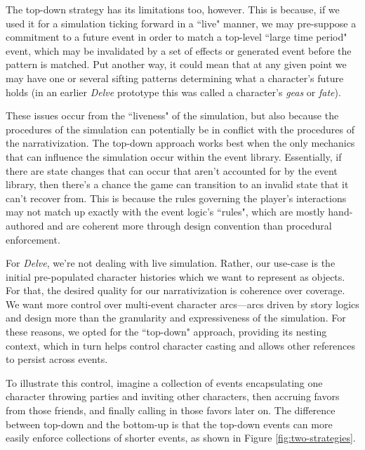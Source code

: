 
The top-down strategy has its limitations too, however. This is because, if we used it for a simulation ticking forward in a ``live" manner, we may pre-suppose a commitment to a future event in order to match a top-level ``large time period" event, which may be invalidated by a set of effects or generated event before the pattern is matched. Put another way, it could mean that at any given point we may have one or several sifting patterns determining what a character's future holds (in an earlier \textit{Delve} prototype this was called a character’s \textit{geas} or \textit{fate}).

These issues occur from the ``liveness" of the simulation, but also because the procedures of the simulation can potentially be in conflict with the procedures of the narrativization. The top-down approach works best when the only mechanics that can influence the simulation occur within the event library. Essentially, if there are state changes that can occur that aren't accounted for by the event library, then there's a chance the game can transition to an invalid state that it can't recover from. This is because the rules governing the player's interactions may not match up exactly with the event logic's ``rules", which are mostly hand-authored and are coherent more through design convention than procedural enforcement.

For \textit{Delve}, we're not dealing with live simulation. Rather, our use-case is the initial pre-populated character histories which we want to represent as objects. For that, the desired quality for our narrativization is coherence over coverage. We want more control over multi-event character arcs---arcs driven by story logics and design more than the granularity and expressiveness of the simulation. For these reasons, we opted for the ``top-down" approach, providing its nesting context, which in turn helps control character casting and allows other references to persist across events.

To illustrate this control, imagine a collection of events encapsulating one character throwing parties and inviting other characters, then accruing favors from those friends, and finally calling in those favors later on. The difference between top-down and the bottom-up is that the top-down events can more easily enforce collections of shorter events, as shown in Figure \ref{fig:two-strategies}.


